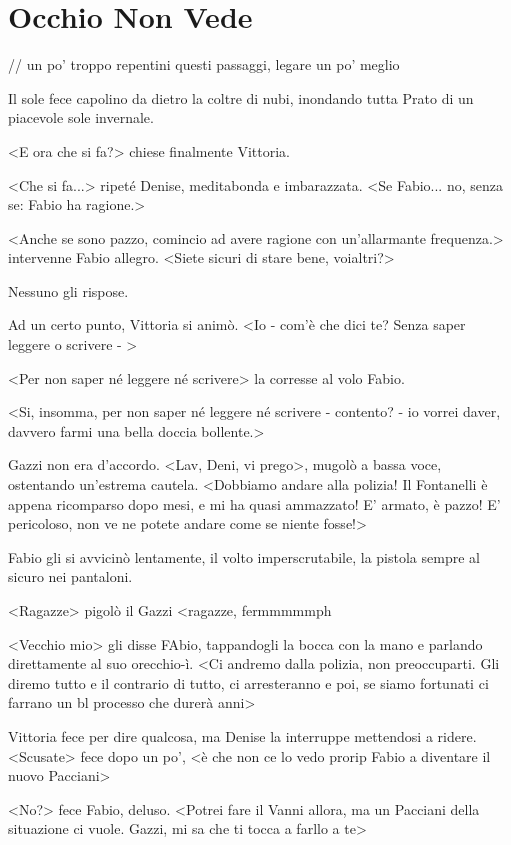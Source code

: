 \chapter{Occhio Non Vede}

// un po' troppo repentini questi passaggi, legare un po' meglio

Il sole fece capolino da dietro la coltre di nubi, inondando tutta Prato di un piacevole sole invernale.

<E ora che si fa?> chiese finalmente Vittoria.

<Che si fa...> ripeté Denise, meditabonda e imbarazzata. <Se Fabio... no, senza se: Fabio ha ragione.>

<Anche se sono pazzo, comincio ad avere ragione con un'allarmante frequenza.> intervenne Fabio allegro. <Siete sicuri di stare bene, voialtri?>

Nessuno gli rispose.

Ad un certo punto, Vittoria si animò. <Io - com'è che dici te? Senza saper leggere o scrivere - >

<Per non saper né leggere né scrivere> la corresse al volo Fabio.

<Si, insomma, per non saper né leggere né scrivere - contento? - io vorrei daver, davvero farmi una bella doccia bollente.>

Gazzi non era d'accordo. <Lav, Deni, vi prego>, mugolò a bassa voce, ostentando un'estrema cautela. <Dobbiamo andare alla polizia! Il Fontanelli è appena ricomparso dopo mesi, e mi ha quasi ammazzato! E' armato, è pazzo! E' pericoloso, non ve ne potete andare come se niente fosse!>

Fabio gli si avvicinò lentamente, il volto imperscrutabile, la pistola sempre al sicuro nei pantaloni. 

<Ragazze> pigolò il Gazzi <ragazze, fermmmmmph

<Vecchio mio> gli disse FAbio, tappandogli la bocca con la mano e parlando direttamente al suo orecchio-ì. <Ci andremo dalla polizia, non preoccuparti. Gli diremo tutto e il contrario di tutto, ci arresteranno e poi, se siamo fortunati ci farrano un bl processo che durerà anni>

Vittoria fece per dire qualcosa, ma Denise la interruppe mettendosi a ridere. <Scusate> fece dopo un po', <è che non ce lo vedo prorip Fabio a diventare il nuovo Pacciani>

<No?> fece Fabio, deluso. <Potrei fare il Vanni allora, ma un  Pacciani della situazione ci vuole. Gazzi, mi sa che ti tocca a farllo a te>


